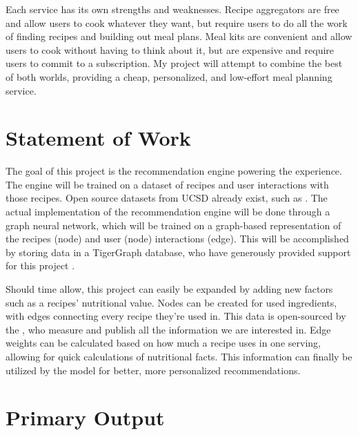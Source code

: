 \documentclass{./styles/ucsdreport}
\begin{document}
Each service has its own strengths and weaknesses. Recipe aggregators are free and allow users to cook whatever they want, but require users to do all the work of finding recipes and building out meal plans. Meal kits are convenient and allow users to cook without having to think about it, but are expensive and require users to commit to a subscription. My project will attempt to combine the best of both worlds, providing a cheap, personalized, and low-effort meal planning service.

\section{Statement of Work}

The goal of this project is the recommendation engine powering the experience. The engine will be trained on a dataset of recipes and user interactions with those recipes. Open source datasets from UCSD already exist, such as \citet{recipegen}. The actual implementation of the recommendation engine will be done through a graph neural network, which will be trained on a graph-based representation of the recipes (node) and user (node) interactions (edge). This will be accomplished by storing data in a TigerGraph database, who have generously provided support for this project \citep{tigergraph}.

Should time allow, this project can easily be expanded by adding new factors such as a recipes' nutritional value. Nodes can be created for used ingredients, with edges connecting every recipe they're used in. This data is open-sourced by the \citeauthor{fooddata}, who measure and publish all the information we are interested in. Edge weights can be calculated based on how much a recipe uses in one serving, allowing for quick calculations of nutritional facts. This information can finally be utilized by the model for better, more personalized recommendations.


\section{Primary Output}
\end{document}

